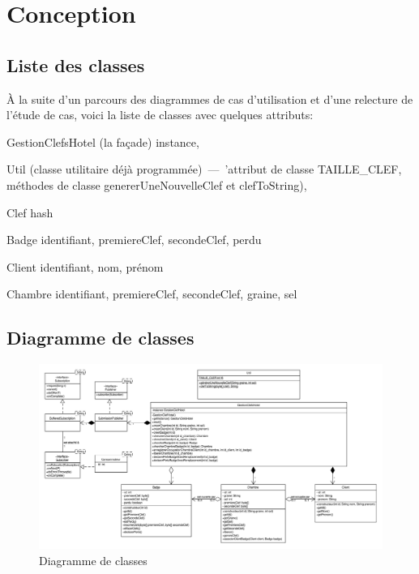 \documentclass[11pt,article]{article}
\begin{document}
\section{Conception}

\subsection{Liste des classes}

À la suite d'un parcours des diagrammes de cas d'utilisation et d'une
relecture de l'étude de cas, voici la liste de classes avec quelques
attributs:
\begin{compactitem}
\item \textsf{GestionClefsHotel} (la façade) instance,
\item \textsf{Util} (classe utilitaire déjà programmée)~---~'attribut
  de classe \textsf{TAILLE\_CLEF}, méthodes de classe
  \textsf{genererUneNouvelleClef} et \textsf{clefToString}),
\item \textsf{Clef} hash
\item \textsf{Badge} identifiant, premiereClef, secondeClef, perdu
\item \textsf{Client} identifiant, nom, prénom
\item \textsf{Chambre} identifiant, premiereClef, secondeClef, graine, sel
\end{compactitem}
\newpage

\subsection{Diagramme de classes}

\begin{figure}[h!]
\begin{center}
\includegraphics[scale=0.4]{DiagrammesDeClasses/gestionclefshotel_uml_diag_classes}
\caption{Diagramme de classes}
\end{center}
\label{umlet_diag_classes}
\end{figure}
\end{document}
